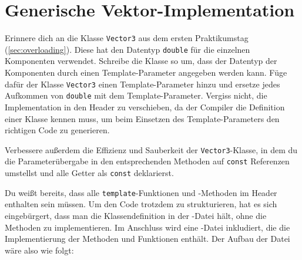 \section{\ExercisePrefixAdvanced Generische Vektor-Implementation}
\label{sec:genericVector}
Erinnere dich an die Klasse \lstinline{Vector3} aus dem ersten Praktikumstag (\ref{sec:overloading}).
Diese hat den Datentyp \lstinline{double} für die einzelnen Komponenten verwendet.
Schreibe die Klasse so um, dass der Datentyp der Komponenten durch einen Template-Parameter angegeben werden kann.
Füge dafür der Klasse \lstinline{Vector3} einen Template-Parameter hinzu und ersetze jedes Aufkommen von \lstinline{double} mit dem Template-Parameter.
Vergiss nicht, die Implementation in den Header zu verschieben, da der Compiler die Definition einer Klasse kennen muss, um beim Einsetzen des Template-Parameters den richtigen Code zu generieren.

Verbessere außerdem die Effizienz und Sauberkeit der \lstinline{Vector3}-Klasse, in dem du die Parameterübergabe in den entsprechenden Methoden auf \lstinline{const} Referenzen umstellst und alle Getter als \lstinline{const} deklarierst.

Du weißt bereits, dass alle \lstinline{template}-Funktionen und -Methoden im Header enthalten sein müssen.
Um den Code trotzdem zu strukturieren, hat es sich eingebürgert, dass man die Klassendefinition in der -Datei hält, ohne die Methoden zu implementieren.
Im Anschluss wird eine -Datei inkludiert, die die Implementierung der Methoden und Funktionen enthält.
%
Der Aufbau der Datei  wäre also wie folgt:

